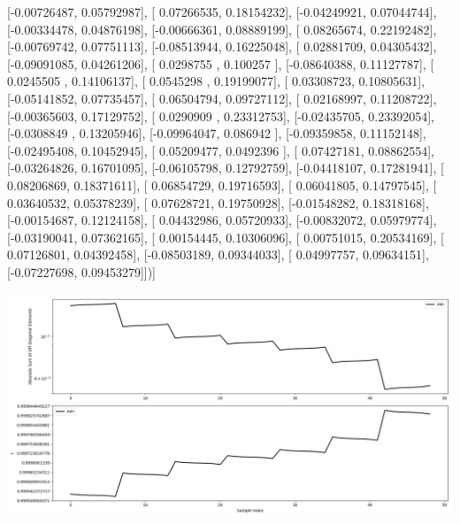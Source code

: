 \documentclass{article}
\begin{document}
       [-0.00726487,  0.05792987],
       [ 0.07266535,  0.18154232],
       [-0.04249921,  0.07044744],
       [-0.00334478,  0.04876198],
       [-0.00666361,  0.08889199],
       [ 0.08265674,  0.22192482],
       [-0.00769742,  0.07751113],
       [-0.08513944,  0.16225048],
       [ 0.02881709,  0.04305432],
       [-0.09091085,  0.04261206],
       [ 0.0298755 ,  0.100257  ],
       [-0.08640388,  0.11127787],
       [ 0.0245505 ,  0.14106137],
       [ 0.0545298 ,  0.19199077],
       [ 0.03308723,  0.10805631],
       [-0.05141852,  0.07735457],
       [ 0.06504794,  0.09727112],
       [ 0.02168997,  0.11208722],
       [-0.00365603,  0.17129752],
       [ 0.0290909 ,  0.23312753],
       [-0.02435705,  0.23392054],
       [-0.0308849 ,  0.13205946],
       [-0.09964047,  0.086942  ],
       [-0.09359858,  0.11152148],
       [-0.02495408,  0.10452945],
       [ 0.05209477,  0.0492396 ],
       [ 0.07427181,  0.08862554],
       [-0.03264826,  0.16701095],
       [-0.06105798,  0.12792759],
       [-0.04418107,  0.17281941],
       [ 0.08206869,  0.18371611],
       [ 0.06854729,  0.19716593],
       [ 0.06041805,  0.14797545],
       [ 0.03640532,  0.05378239],
       [ 0.07628721,  0.19750928],
       [-0.01548282,  0.18318168],
       [-0.00154687,  0.12124158],
       [ 0.04432986,  0.05720933],
       [-0.00832072,  0.05979774],
       [-0.03190041,  0.07362165],
       [ 0.00154445,  0.10306096],
       [ 0.00751015,  0.20534169],
       [ 0.07126801,  0.04392458],
       [-0.08503189,  0.09344033],
       [ 0.04997757,  0.09634151],
       [-0.07227698,  0.09453279]])]
\begin{center}
\includegraphics[scale=.9]{report_pickled_controls152/control_dpn_all.png}

\end{center}
\end{document}
